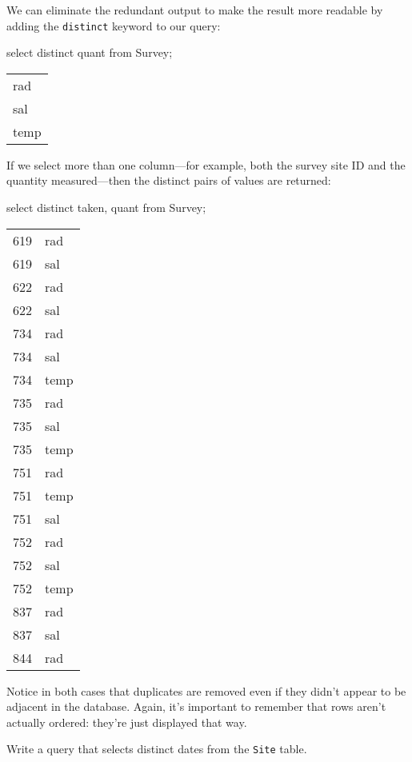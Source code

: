 \documentclass{book}
\begin{document}
We can eliminate the redundant output to make the result more readable
by adding the \texttt{distinct} keyword to our query:

\begin{VerbIn}
select distinct quant from Survey;
\end{VerbIn}

\begin{tabular}{l}
rad \\
sal \\
temp \\
\end{tabular}

If we select more than one column---for example, both the survey site ID
and the quantity measured---then the distinct pairs of values are
returned:

\begin{VerbIn}
select distinct taken, quant from Survey;
\end{VerbIn}

\begin{tabular}{ll}
619 & rad \\
619 & sal \\
622 & rad \\
622 & sal \\
734 & rad \\
734 & sal \\
734 & temp \\
735 & rad \\
735 & sal \\
735 & temp \\
751 & rad \\
751 & temp \\
751 & sal \\
752 & rad \\
752 & sal \\
752 & temp \\
837 & rad \\
837 & sal \\
844 & rad \\
\end{tabular}

Notice in both cases that duplicates are removed even if they didn't
appear to be adjacent in the database. Again, it's important to remember
that rows aren't actually ordered: they're just displayed that way.

\begin{challenge}
  Write a query that selects distinct dates from the \texttt{Site}
  table.
\end{challenge}
\end{document}
